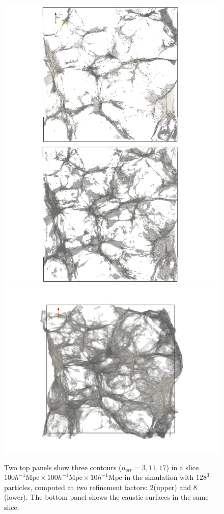 \documentclass[fleqn,usenatbib,useAMS]{mnras}
\newcommand\hl{\bgroup\markoverwith
  {\textcolor{yellow}{\rule[-.5ex]{2pt}{2.5ex}}}\ULon}
\begin{document}
 
\begin{figure}
\begin{minipage}[t]{.99\linewidth}
  \centering\includegraphics[width=10.cm]{fig12a.pdf}
  \centering\includegraphics[width=10.cm]{fig12b.pdf}  
\end{minipage}\hfill
\caption{Two top panels show  three contours ($n_{str}=3, 11, 17$) in a slice $100h^{-1} \text{Mpc} \times 100h^{-1} \text{Mpc} \times 10h^{-1} \text{Mpc}$ in the simulation with $128^3$ particles, computed at two refinement factors: 2(upper) and 8 (lower). The bottom panel shows the caustic surfaces in the same slice. }
\label{fig:NstrCaust}
\end{figure}
\end{document}
